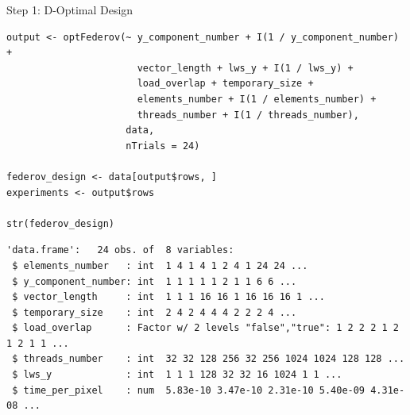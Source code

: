 \documentclass[10pt, compress, aspectratio=169, xcolor={table,usenames,dvipsnames}]{beamer}
\begin{document}
\begin{frame}[fragile,label={sec:orgeb0a633}]{Step 1: D-Optimal Design}
 \scriptsize
\lstset{language=r,label= ,caption= ,captionpos=b,numbers=none}
\begin{lstlisting}
output <- optFederov(~ y_component_number + I(1 / y_component_number) +
                       vector_length + lws_y + I(1 / lws_y) +
                       load_overlap + temporary_size +
                       elements_number + I(1 / elements_number) +
                       threads_number + I(1 / threads_number),
                     data,
                     nTrials = 24)

federov_design <- data[output$rows, ]
experiments <- output$rows

str(federov_design)
\end{lstlisting}

\begin{verbatim}
'data.frame':	24 obs. of  8 variables:
 $ elements_number   : int  1 4 1 4 1 2 4 1 24 24 ...
 $ y_component_number: int  1 1 1 1 1 2 1 1 6 6 ...
 $ vector_length     : int  1 1 1 16 16 1 16 16 16 1 ...
 $ temporary_size    : int  2 4 2 4 4 4 2 2 2 4 ...
 $ load_overlap      : Factor w/ 2 levels "false","true": 1 2 2 2 1 2 1 2 1 1 ...
 $ threads_number    : int  32 32 128 256 32 256 1024 1024 128 128 ...
 $ lws_y             : int  1 1 1 128 32 32 16 1024 1 1 ...
 $ time_per_pixel    : num  5.83e-10 3.47e-10 2.31e-10 5.40e-09 4.31e-08 ...
\end{verbatim}

\normalsize
\end{frame}
\end{document}

